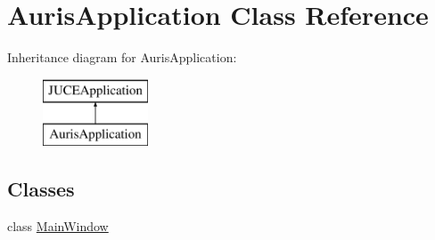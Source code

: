 \hypertarget{class_auris_application}{}\section{Auris\+Application Class Reference}
\label{class_auris_application}
Inheritance diagram for Auris\+Application\+:\begin{figure}[H]
\begin{center}
\leavevmode
\includegraphics[height=2.000000cm]{class_auris_application}
\end{center}
\end{figure}
\subsection*{Classes}
\begin{DoxyCompactItemize}
\item 
class \hyperlink{class_auris_application_1_1_main_window}{Main\+Window}
\end{DoxyCompactItemize}
